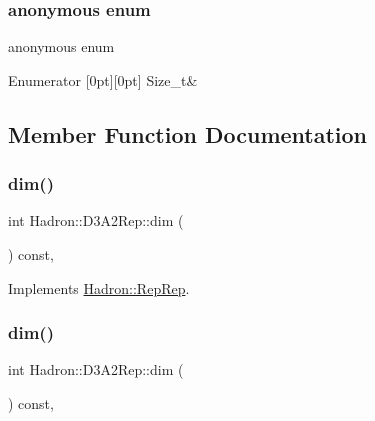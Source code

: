 \subsubsection{\texorpdfstring{anonymous enum}{anonymous enum}}
{\footnotesize\ttfamily anonymous enum}

\begin{DoxyEnumFields}{Enumerator}
[0pt][0pt]{}\mbox{\label{structHadron_1_1D3A2Rep_a1a730ccf73b619a09709fb441807ad26a2a16223c20702a6ce2e3c613c6380720}} 
Size\+\_\+t&\\
\hline

\end{DoxyEnumFields}


\subsection{Member Function Documentation}
\mbox{\label{structHadron_1_1D3A2Rep_a38d0163b1fb9994be68c43d2bfc90ce4}} 
\subsubsection{\texorpdfstring{dim()}{dim()}\hspace{0.1cm}{\footnotesize\ttfamily [1/5]}}
{\footnotesize\ttfamily int Hadron\+::\+D3\+A2\+Rep\+::dim (\begin{DoxyParamCaption}{ }\end{DoxyParamCaption}) const\hspace{0.3cm}{\ttfamily [inline]}, {\ttfamily [virtual]}}



Implements \mbox{\hyperlink{structHadron_1_1RepRep_a92c8802e5ed7afd7da43ccfd5b7cd92b}{Hadron\+::\+Rep\+Rep}}.

\mbox{\label{structHadron_1_1D3A2Rep_a38d0163b1fb9994be68c43d2bfc90ce4}} 
\subsubsection{\texorpdfstring{dim()}{dim()}\hspace{0.1cm}{\footnotesize\ttfamily [2/5]}}
{\footnotesize\ttfamily int Hadron\+::\+D3\+A2\+Rep\+::dim (\begin{DoxyParamCaption}{ }\end{DoxyParamCaption}) const\hspace{0.3cm}{\ttfamily [inline]}, {\ttfamily [virtual]}}



